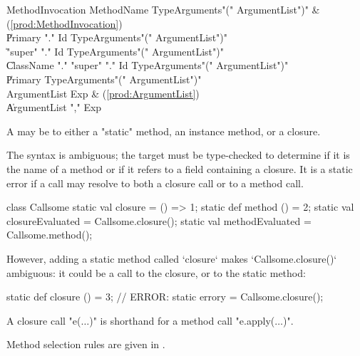 \begin{bbgrammar}
 MethodInvocation    \: MethodName TypeArguments\opt \xcd"(" ArgumentList\opt \xcd")" & (\ref{prod:MethodInvocation})\\%
    \| Primary \xcd"." Id TypeArguments\opt \xcd"(" ArgumentList\opt \xcd")"\\
    \| \xcd"super" \xcd"." Id TypeArguments\opt \xcd"(" ArgumentList\opt \xcd")"\\
    \| ClassName \xcd"." \xcd"super"  \xcd"." Id TypeArguments\opt \xcd"(" ArgumentList\opt \xcd")"\\
    \| Primary TypeArguments\opt \xcd"(" ArgumentList\opt \xcd")"\\
 ArgumentList    \: Exp & (\ref{prod:ArgumentList})\\%
    \| ArgumentList \xcd"," Exp\\
\end{bbgrammar}



A  may be to either a \xcd"static" method, an
instance method, or a closure.

The syntax is ambiguous; the target must be type-checked to determine if it is
the name of a method or if it refers to a field containing a closure. It is a
static error if a call may resolve to both a closure call or to a method call.
\begin{xten}
class Callsome {
  static val closure = () => 1;
  static def method () = 2;
  static val closureEvaluated = Callsome.closure();
  static val methodEvaluated = Callsome.method();
}
\end{xten}
%
However, adding a static method called \xcd`closure` makes \xcd`Callsome.closure()`
ambiguous: it could be a call to the closure, or to the static method: 

\begin{xten}
  static def closure () = 3;
  // ERROR: static errory = Callsome.closure();
\end{xten}

A closure call \xcdmath"e($\dots$)" is shorthand for a method call
\xcdmath"e.apply($\dots$)". 

Method selection rules are given in .

